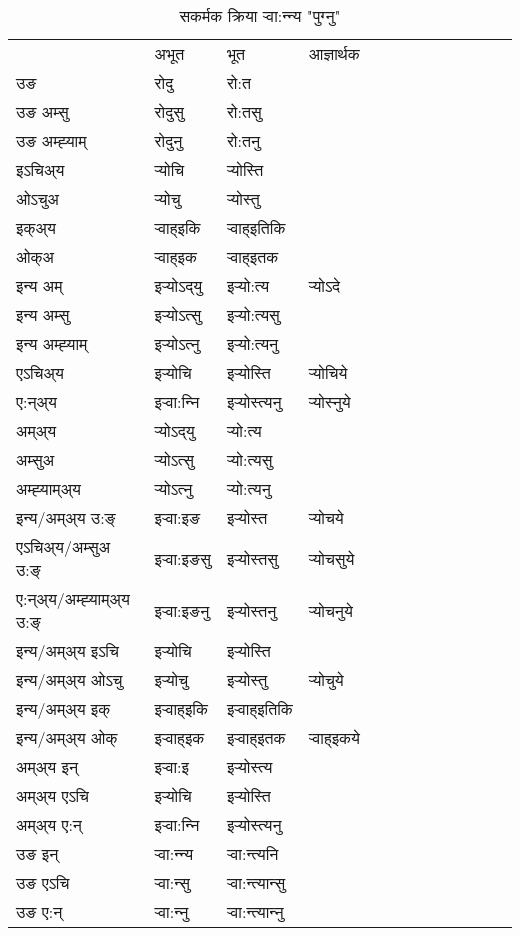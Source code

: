 \begin{table}[H]
\centering
\caption{\label{ot.vt} सकर्मक क्रिया  र्‍वा:न्‍न्य  "पुग्नु"  }
\begin{tabular}{l|l|l|l|l|l|l|l|l|l|l|l|l}  \toprule
&अभूत & भूत & आज्ञार्थक \\ 
उङ &रोदु &रो:त \\ 
उङ अम्सु &रोदुसु &रो:तसु \\ 
उङ अम्ह्‍याम् &रोदुनु &रो:तनु \\ 
इऽचिअ्य &र्‍योचि &र्‍योस्ति   \\ 
ओऽचुअ &र्‍योचु &र्‍योस्तु   \\ 
इक्अ्य &र्‍वाह्इकि &र्‍वाह्इतिकि   \\ 
ओक्अ &र्‍वाह्इक &र्‍वाह्इतक   \\ 
इन्य अम् & इर्‍योऽद्‌यु  & इर्‍यो:त्य &र्‍योऽदे  \\ 
इन्य अम्सु & इर्‍योऽत्सु  & इर्‍यो:त्यसु   \\ 
इन्य अम्ह्‍याम् & इर्‍योऽत्‍नु  & इर्‍यो:त्यनु   \\ 
एऽचिअ्य & इर्‍योचि & इर्‍योस्ति &र्‍योचिये    \\ 
ए:न्अ्य & इर्‍वा:न्‍नि  & इर्‍योस्त्यनु &र्‍योस्‍नुये  \\ 
अम्अ्य & र्‍योऽद्‌यु  & र्‍यो:त्य  \\ 
अम्सुअ & र्‍योऽत्सु & र्‍यो:त्यसु  \\ 
अम्ह्‍याम्अ्य & र्‍योऽत्‍नु  & र्‍यो:त्यनु \\ 
\midrule
इन्य/अम्अ्य उ:ङ्‌&इर्‍वा:इङ & इर्‍योस्त &र्‍योचये \\ 
एऽचिअ्य/अम्सुअ उ:ङ्‌ &इर्‍वा:इङसु & इर्‍योस्तसु &र्‍योचसुये \\ 
ए:न्अ्य/अम्ह्‍याम्अ्य उ:ङ्‌ &इर्‍वा:इङनु & इर्‍योस्तनु &र्‍योचनुये \\ 
इन्य/अम्अ्य इऽचि & इर्‍योचि & इर्‍योस्ति    \\ 
इन्य/अम्अ्य ओऽचु & इर्‍योचु & इर्‍योस्तु  &र्‍योचुये  \\ 
इन्य/अम्अ्य इक् & इर्‍वाह्इकि & इर्‍वाह्इतिकि   \\ 
इन्य/अम्अ्य ओक् & इर्‍वाह्इक & इर्‍वाह्इतक  &र्‍वाह्इकये  \\ 
अम्अ्य इन् & इर्‍वा:इ & इर्‍योस्त्य   \\ 
अम्अ्य एऽचि & इर्‍योचि & इर्‍योस्ति    \\ 
अम्अ्य ए:न् & इर्‍वा:न्‍नि  & इर्‍योस्त्यनु  \\ 
\midrule
उङ इन् & र्‍वा:न्‍न्य  & र्‍वा:न्त्यनि  \\ 
उङ एऽचि & र्‍वा:न्सु  & र्‍वा:न्त्यान्सु   \\ 
उङ ए:न्& र्‍वा:न्‍नु  & र्‍वा:न्त्यान्‍नु   \\ 
\bottomrule
\end{tabular}
\end{table}


